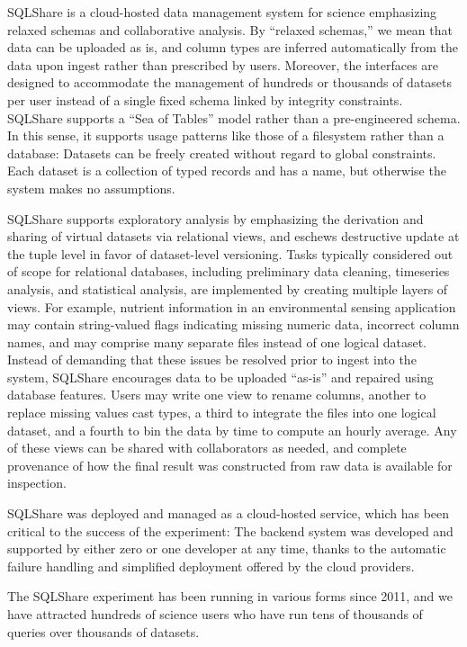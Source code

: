 \documentclass{sig-alternate}
\newcommand{\sqlshare}{SQLShare}
\begin{document}
\sqlshare{} is a cloud-hosted data management system for science emphasizing relaxed schemas and collaborative analysis.
By ``relaxed schemas,'' we mean that data can be uploaded as is, and column types are inferred automatically from the data upon ingest rather than prescribed by users.
Moreover, the interfaces are designed to accommodate the management of hundreds or
thousands of datasets per user instead of a single fixed schema linked by integrity constraints.  \sqlshare{} supports a ``Sea of Tables'' model rather than a pre-engineered schema.
In this sense, it supports usage patterns like those of a filesystem rather than a database: Datasets can be freely created without regard to global constraints. Each dataset is a collection of typed records and has a name, but otherwise the system makes no assumptions.

\sqlshare{} supports exploratory analysis by emphasizing the derivation and
sharing of virtual datasets via relational views, and eschews destructive update at the tuple
level in favor of dataset-level versioning.  Tasks typically considered out of scope for relational databases,
including preliminary data cleaning, timeseries analysis, and statistical analysis, are implemented by creating multiple layers of views.
For example, nutrient information in an environmental sensing application may contain string-valued flags indicating missing numeric data,
incorrect column names, and may comprise many separate files instead of one logical dataset.
Instead of demanding that these issues be resolved prior to ingest into the system, \sqlshare{} encourages data to
be uploaded ``as-is'' and repaired using database features.  Users
may write one view  to rename columns, another to replace missing values cast types,
a third to integrate the files into one logical dataset, and a fourth to bin the data by time
to compute an hourly average.  Any of these views can be shared with collaborators as needed, and
complete provenance of how the final result was constructed from raw data is available for inspection.

\sqlshare{} was deployed and managed as a cloud-hosted service, which has been critical to the success of the experiment: The
backend system was developed and supported by either zero or one developer at any time, thanks to the automatic failure handling and simplified deployment offered by the cloud providers.

The \sqlshare{} experiment has been running in various forms since 2011, and we have attracted hundreds of science users who have run tens of thousands of queries over thousands of datasets.
\end{document}
